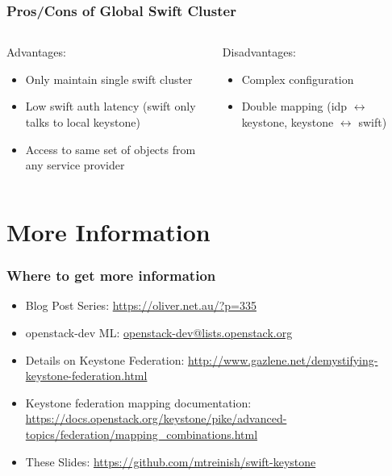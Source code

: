 \documentclass[aspectratio=169,11pt,hyperref={colorlinks=true}]{beamer}
\begin{document}
\begin{frame}
\frametitle{Pros/Cons of Global Swift Cluster}
\begin{columns}[T]
    \begin{column}{.48\textwidth}
        Advantages:
        \begin{itemize}
            \item Only maintain single swift cluster
            \item Low swift auth latency (swift only talks to local keystone)
            \item Access to same set of objects from any service provider
        \end{itemize}
    \end{column}
    \begin{column}{.48\textwidth}
        Disadvantages:
        \begin{itemize}
            \item Complex configuration
            \item Double mapping (idp $\leftrightarrow$ keystone, keystone $\leftrightarrow$ swift)
        \end{itemize}
    \end{column}
\end{columns}
\end{frame}

\section{More Information}
\begin{frame}
\frametitle{Where to get more information}
    \begin{itemize}
        \item Blog Post Series: \href{https://oliver.net.au/?p=335}{https://oliver.net.au/?p=335}
        \item openstack-dev ML: \href{mailto:openstack-dev@lists.openstack.org}{openstack-dev@lists.openstack.org}
        \item Details on Keystone Federation: \href{http://www.gazlene.net/demystifying-keystone-federation.html}{http://www.gazlene.net/demystifying-keystone-federation.html}
        \item Keystone federation mapping documentation: \href{https://docs.openstack.org/keystone/pike/advanced-topics/federation/mapping\_combinations.html}{https://docs.openstack.org/keystone/pike/advanced-topics/federation/mapping\_combinations.html}
        \item These Slides: \href{https://github.com/mtreinish/swift-keystone}{https://github.com/mtreinish/swift-keystone}
   \end{itemize}
\end{frame}
\end{document}
